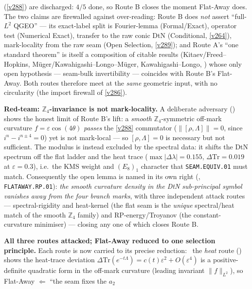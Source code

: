 \documentclass[11pt,a4paper]{article}
\begin{document}
\begin{keybox}
(\vref{v288}) are discharged: $4/5$ done, so Route B closes the moment Flat-Away does. The two claims are
firewalled against over-reading: Route B does \emph{not} assert ``full-$L^2$ QGEO'' --- its exact-label split is
Fourier-lemma (Formal/Exact), operator test (Numerical Exact), transfer to the raw conic DtN (Conditional,
\vref{v264}), mark-locality from the raw seam (Open Selection, \vref{v289}); and Route A's ``one standard
theorem'' is itself a composition of citable results (Kitaev/Freed--Hopkins, M\"uger/Kawahigashi--Longo--M\"uger,
Kawahigashi--Longo, ) whose only open hypothesis ---
seam-bulk invertibility --- coincides with Route B's Flat-Away. Both routes therefore meet at the \emph{same}
geometric input, with no circularity (the import firewall of \vref{v286}).
\par\smallskip\noindent\textbf{Red-team: $\mathbb{Z}_4$-invariance is not mark-locality.} A deliberate
adversary () shows the honest limit of Route B's lift: a
\emph{smooth} $\mathbb{Z}_4$-symmetric off-mark curvature $f=\varepsilon\cos(4\theta)$ \emph{passes} the
\vref{v288} commutator ($\|[\rho,\Lambda]\|=0$, since $i^n-i^{n\pm4}=0$) yet is not mark-local --- so
$[\rho,\Lambda]{=}0$ is necessary but not sufficient. The modulus is instead excluded by the spectral data:
it shifts the DtN spectrum off the flat ladder and the heat trace ($\max|\Delta\lambda|=0.155$,
$\Delta\mathrm{Tr}=0.019$ at $\varepsilon=0.3$), i.e.\ the KMS weight and $(E_8)_1$ character that
\texttt{SEAM.EQUIV.01} must match. Consequently the open lemma is named in its own right
(, \texttt{FLATAWAY.RP.01}): \emph{the smooth curvature density in the DtN
sub-principal symbol vanishes away from the four branch marks}, with three independent attack routes ---
spectral-rigidity and heat-kernel (the flat seam is the \emph{unique} spectral/heat match of the smooth
$\mathbb{Z}_4$ family) and RP-energy/Troyanov (the constant-curvature minimiser) --- closing any one of which
closes Route B.
\par\smallskip\noindent\textbf{All three routes attacked; Flat-Away reduced to one selection principle.} Each
route is now carried to its precise reduction: \mE\ the \emph{heat} route
() shows the heat-trace deviation
$\Delta\mathrm{Tr}(e^{-t\Lambda})=c(t)\varepsilon^2+O(\varepsilon^4)$ is a positive-definite quadratic form in
the off-mark curvature (leading invariant $\|f\|_{L^2}$), so Flat-Away $\Leftarrow$ ``the seam fixes the $a_2$

\end{keybox}
\end{document}
